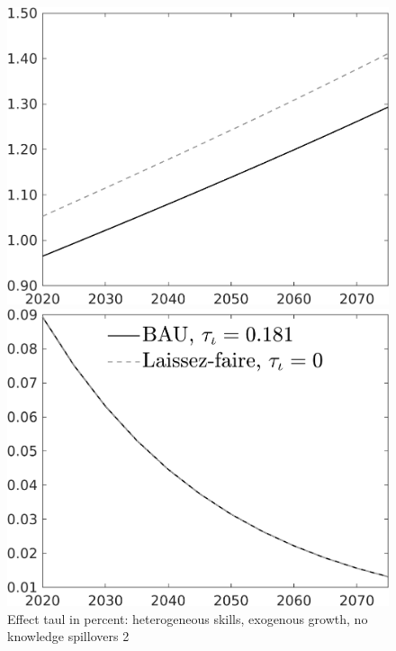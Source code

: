 \documentclass[12pt]{article}
\begin{document}
\begin{figure}[h!!]
	\centering
	\caption{Effect taul in percent: heterogeneous skills, exogenous growth, no knowledge spillovers 2}\label{fig:LF_BAU_nsk0_xgr1_noknow2}
	\begin{minipage}[]{0.32\textwidth}
		\includegraphics[width=1\textwidth]{../../codding_model/own_basedOnFried/optimalPol_010922_revision/figures/all_13Sept22/CompTaul_LFBAU_Reg0_Y_spillover0_nsk0_xgr1_knspil1_sep1_countec0_GovRev0_etaa0.79_lgd0.png}
	\end{minipage}	
\begin{minipage}[]{0.32\textwidth}
	\includegraphics[width=1\textwidth]{../../codding_model/own_basedOnFried/optimalPol_010922_revision/figures/all_13Sept22/CompTaul_LFBAU_Reg0_GFF_spillover0_nsk0_xgr1_knspil1_sep1_countec0_GovRev0_etaa0.79_lgd1.png}

\end{minipage}
\end{figure}
\end{document}
